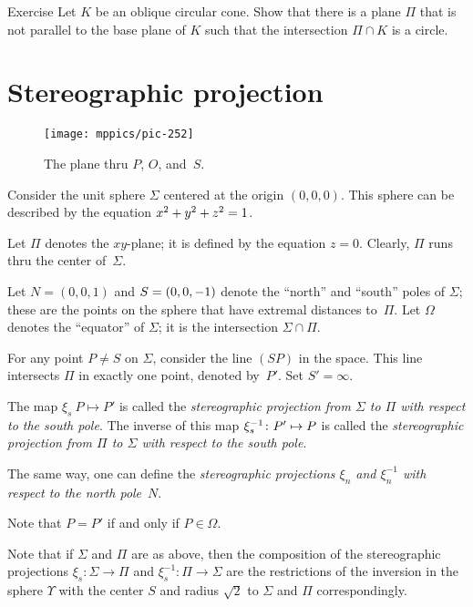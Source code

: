\begin{thm}{Exercise}\label{ex:cone}
Let $K$ be an oblique circular cone. Show that there is a plane $\Pi$ that is not parallel to the base plane of $K$ such that the intersection $\Pi\cap K$ is a circle.
\end{thm}


\section*{Stereographic projection}

{

\begin{wrapfigure}{r}{48mm}
\vskip-10mm
\centering
\texttt{[image: mppics/pic-252]}
\caption*{The plane thru $P$, $O$, and~$S$.}
\end{wrapfigure}

Consider the unit sphere $\Sigma$ 
centered at the origin $(0,0,0)$.
This sphere can be described by the equation $x^2+y^2+z^2\z=1$. 

Let $\Pi$ denotes the $xy$-plane;
it is defined by the equation $z = 0$.
Clearly, $\Pi$
runs thru the center of~$\Sigma$.

Let $N = (0, 0, 1)$ and $S\z=(0, 0, -1)$ denote the ``north'' and ``south'' poles of $\Sigma$;
these are the points on the sphere that have extremal distances to~$\Pi$.
Let $\Omega$ denotes the ``equator'' of $\Sigma$;
it is the intersection $\Sigma\cap\Pi$.

}

For any point $P\ne S$ on $\Sigma$,
consider the line $(SP)$ in the space. 
This line intersects $\Pi$ in exactly one point, denoted by~$P'$. 
Set $S'=\infty$.


The map $\xi_s\: P\mapsto P'$ is called the \emph{stereographic projection from $\Sigma$ to $\Pi$ with respect to the south pole}.
The inverse of this map $\xi^{-1}_s\: P'\z\mapsto P$ is called the {}\emph{stereographic projection from $\Pi$ to $\Sigma$ with respect to the south pole}.

The same way, one can define the
{}\emph{stereographic projections $\xi_n$ and $\xi^{-1}_n$ with respect to the north pole}~$N$.

Note that $P=P'$ if and only if $P\in\Omega$.


Note that if $\Sigma$ and $\Pi$ are as above,
then the composition of the stereographic projections 
$\xi_s: \Sigma\to\Pi$ and  $\xi^{-1}_s: \Pi\to\Sigma$
are the restrictions of the inversion in the sphere $\Upsilon$ with the center $S$ and radius $\sqrt{2}$ to $\Sigma$ and $\Pi$ correspondingly.


